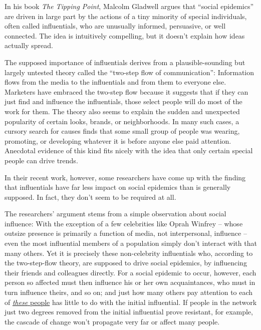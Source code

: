 \documentclass[12pt,a4paper]{article}
\begin{document}
\begin{reading}


\begin{examtext}
In his book \textit{The Tipping Point}, Malcolm Gladwell argues that ``social epidemics'' are driven in large part by the actions of a tiny minority of special individuals, often called influentials, who are unusually informed, persuasive, or well connected. The idea is intuitively compelling, but it doesn't explain how ideas actually spread.

The supposed importance of influentials derives from a plausible-sounding but largely untested theory called the ``two-step flow of communication'': Information flows from the media to the influentials and from them to everyone else. Marketers have embraced the two-step flow because it suggests that if they can just find and influence the influentials, those select people will do most of the work for them. The theory also seems to explain the sudden and unexpected popularity of certain looks, brands, or neighborhoods. In many such cases, a cursory search for causes finds that some small group of people was wearing, promoting, or developing whatever it is before anyone else paid attention. Anecdotal evidence of this kind fits nicely with the idea that only certain special people can drive trends.

In their recent work, however, some researchers have come up with the finding that influentials have far less impact on social epidemics than is generally supposed. In fact, they don't seem to be required at all.

The researchers' argument stems from a simple observation about social influence: With the exception of a few celebrities like Oprah Winfrey -- whose outsize presence is primarily a function of media, not interpersonal, influence -- even the most influential members of a population simply don't interact with that many others. Yet it is precisely these non-celebrity influentials who, according to the two-step-flow theory, are supposed to drive social epidemics, by influencing their friends and colleagues directly. For a social epidemic to occur, however, each person so affected must then influence his or her own acquaintances, who must in turn influence theirs, and so on; and just how many others pay attention to each of \uline{\textit{these} people} has little to do with the initial influential. If people in the network just two degrees removed from the initial influential prove resistant, for example, the cascade of change won't propagate very far or affect many people.


\end{examtext}
\end{reading}
\end{document}
